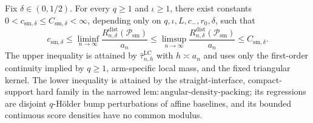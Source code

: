 Fix \(\delta\in(0,1/2)\). For every \(q\geq1\) and \(\iota\geq1\), there exist constants \(0<c_{\mathrm{sm},\delta}\leq C_{\mathrm{sm},\delta}<\infty\), depending only on \(q,\iota,L,c_{-},r_0,\delta\), such that \[c_{\mathrm{sm},\delta}\leq\liminf_{n\to\infty}\frac{R_{n,\delta}^{\mathrm{dist}}(\mathcal{P}_{\mathrm{sm}})}{a_n}\leq\limsup_{n\to\infty}\frac{R_{n,\delta}^{\mathrm{dist}}(\mathcal{P}_{\mathrm{sm}})}{a_n}\leq C_{\mathrm{sm},\delta}.\] The upper inequality is attained by \(\widehat{\tau}^{\mathrm{LC}}_{n,h}\) with \(h\asymp a_n\) and uses only the first-order continuity implied by \(q\geq1\), arm-specific local mass, and the fixed triangular kernel. The lower inequality is attained by the straight-interface, compact-support hard family in the narrowed \(\mathrm{lem:angular\text{-}density\text{-}packing}\); its regressions are disjoint \(q\)-H\"older bump perturbations of affine baselines, and its bounded continuous score densities have no common modulus.